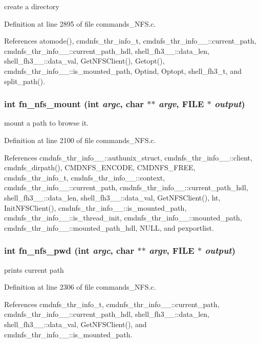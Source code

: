 create a directory 

Definition at line 2895 of file commands\_\-NFS.c.

References atomode(), cmdnfs\_\-thr\_\-info\_\-t, cmdnfs\_\-thr\_\-info\_\-\_\-::current\_\-path, cmdnfs\_\-thr\_\-info\_\-\_\-::current\_\-path\_\-hdl, shell\_\-fh3\_\-\_\-::data\_\-len, shell\_\-fh3\_\-\_\-::data\_\-val, Get\-NFSClient(), Getopt(), cmdnfs\_\-thr\_\-info\_\-\_\-::is\_\-mounted\_\-path, Optind, Optopt, shell\_\-fh3\_\-t, and split\_\-path().
\subsubsection{\setlength{\rightskip}{0pt plus 5cm}int fn\_\-nfs\_\-mount (int {\em argc}, char $\ast$$\ast$ {\em argv}, FILE $\ast$ {\em output})}\label{commands__NFS_8c_a41}


mount a path to browse it. 

Definition at line 2100 of file commands\_\-NFS.c.

References cmdnfs\_\-thr\_\-info\_\-\_\-::authunix\_\-struct, cmdnfs\_\-thr\_\-info\_\-\_\-::client, cmdnfs\_\-dirpath(), CMDNFS\_\-ENCODE, CMDNFS\_\-FREE, cmdnfs\_\-thr\_\-info\_\-t, cmdnfs\_\-thr\_\-info\_\-\_\-::context, cmdnfs\_\-thr\_\-info\_\-\_\-::current\_\-path, cmdnfs\_\-thr\_\-info\_\-\_\-::current\_\-path\_\-hdl, shell\_\-fh3\_\-\_\-::data\_\-len, shell\_\-fh3\_\-\_\-::data\_\-val, Get\-NFSClient(), ht, Init\-NFSClient(), cmdnfs\_\-thr\_\-info\_\-\_\-::is\_\-mounted\_\-path, cmdnfs\_\-thr\_\-info\_\-\_\-::is\_\-thread\_\-init, cmdnfs\_\-thr\_\-info\_\-\_\-::mounted\_\-path, cmdnfs\_\-thr\_\-info\_\-\_\-::mounted\_\-path\_\-hdl, NULL, and pexportlist.
\subsubsection{\setlength{\rightskip}{0pt plus 5cm}int fn\_\-nfs\_\-pwd (int {\em argc}, char $\ast$$\ast$ {\em argv}, FILE $\ast$ {\em output})}\label{commands__NFS_8c_a43}


prints current path 

Definition at line 2306 of file commands\_\-NFS.c.

References cmdnfs\_\-thr\_\-info\_\-t, cmdnfs\_\-thr\_\-info\_\-\_\-::current\_\-path, cmdnfs\_\-thr\_\-info\_\-\_\-::current\_\-path\_\-hdl, shell\_\-fh3\_\-\_\-::data\_\-len, shell\_\-fh3\_\-\_\-::data\_\-val, Get\-NFSClient(), and cmdnfs\_\-thr\_\-info\_\-\_\-::is\_\-mounted\_\-path.
